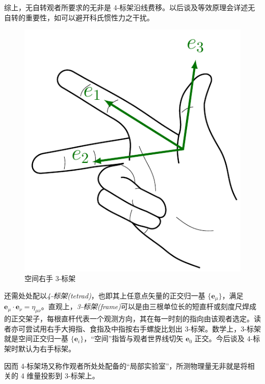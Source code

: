 综上，无自转观者所要求的无非是 4-标架沿线费移。以后谈及等效原理会详述无自转的重要性，如可以避开科氏惯性力之干扰。

\begin{figure}
    \includegraphics[width=.3\textwidth]{fig/chpt01/tetrad hand.pdf}
    \caption{空间右手 3-标架}
\end{figure}
还需处处配以\textit{4-标架(tetrad)}，也即其上任意点矢量的正交归一基 $\{\bm{e}_\mu\}$，满足 $\bm{e}_\mu\cdot\bm{e}_\nu=\eta_{\mu\nu}$。直观上，\textit{3-标架(frame)}可以是由三根单位长的短直杆或刻度尺焊成的正交架子，每根直杆代表一个观测方向，其在每一时刻的指向由该观者选定。读者亦可尝试用右手大拇指、食指及中指按右手螺旋比划出 3-标架。数学上，3-标架就是空间正交归一基 $\{\bm{e}_i\}$，“空间”指皆与观者世界线切矢 $\bm{e}_0$ 正交。今后谈及 4-标架时默认为右手标架。



因而 4-标架场又称作观者所处处配备的“局部实验室”，所测物理量无非就是将相关的 4 维量投影到 3-标架上。


